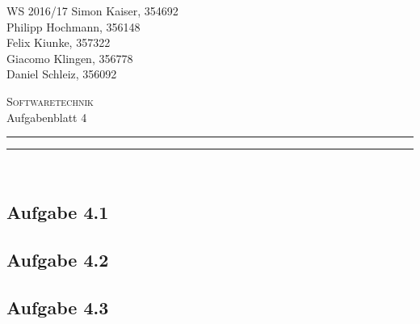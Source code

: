 \documentclass[a4paper,graphics,11pt]{article}
\newcommand\aufgabe[1]{\subsection*{Aufgabe #1}}
\newcommand\aufgabenteil[1]{\subsubsection*{#1}}
\begin{document}
\noindent WS 2016/17                      \hfill Simon Kaiser, 354692 \\
\null                                     \hfill Philipp Hochmann, 356148 \\
\null                                     \hfill Felix Kiunke, 357322 \\
\null                                     \hfill Giacomo Klingen, 356778 \\
\null                                     \hfill Daniel Schleiz, 356092 \\

\begin{center}
\Large \textsc{Softwaretechnik} \\   %
\large Aufgabenblatt 4               %
\end{center}
\begin{center}
\rule[0.5ex]{\textwidth}{0.6pt}\vspace*{-\baselineskip}\vspace{3.2pt}
\rule[0.5ex]{\textwidth}{1.6pt}\\
\end{center}


%
% 

\aufgabe{4.1}


\aufgabe{4.2}


\aufgabe{4.3}

\end{document}
